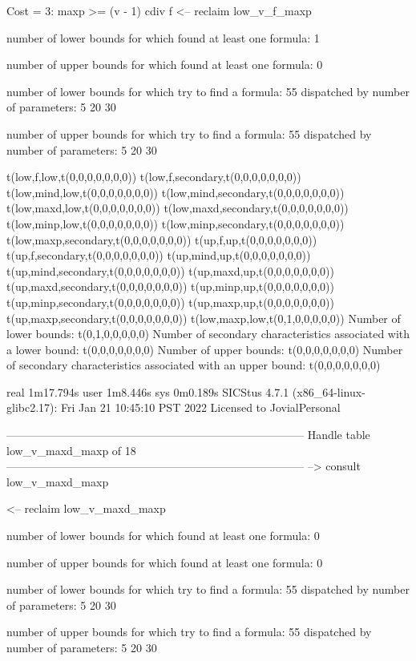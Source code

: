 Cost =  3:  maxp >= (v - 1) cdiv f
<-- reclaim low_v_f_maxp

number of lower bounds for which found at least one formula: 1

number of upper bounds for which found at least one formula: 0

number of lower bounds for which try to find a formula: 55
dispatched by number of parameters: 5  20  30

number of upper bounds for which try to find a formula: 55
dispatched by number of parameters: 5  20  30

t(low,f,low,t(0,0,0,0,0,0,0))
t(low,f,secondary,t(0,0,0,0,0,0,0))
t(low,mind,low,t(0,0,0,0,0,0,0))
t(low,mind,secondary,t(0,0,0,0,0,0,0))
t(low,maxd,low,t(0,0,0,0,0,0,0))
t(low,maxd,secondary,t(0,0,0,0,0,0,0))
t(low,minp,low,t(0,0,0,0,0,0,0))
t(low,minp,secondary,t(0,0,0,0,0,0,0))
t(low,maxp,secondary,t(0,0,0,0,0,0,0))
t(up,f,up,t(0,0,0,0,0,0,0))
t(up,f,secondary,t(0,0,0,0,0,0,0))
t(up,mind,up,t(0,0,0,0,0,0,0))
t(up,mind,secondary,t(0,0,0,0,0,0,0))
t(up,maxd,up,t(0,0,0,0,0,0,0))
t(up,maxd,secondary,t(0,0,0,0,0,0,0))
t(up,minp,up,t(0,0,0,0,0,0,0))
t(up,minp,secondary,t(0,0,0,0,0,0,0))
t(up,maxp,up,t(0,0,0,0,0,0,0))
t(up,maxp,secondary,t(0,0,0,0,0,0,0))
t(low,maxp,low,t(0,1,0,0,0,0,0))
Number of lower bounds:                                             t(0,1,0,0,0,0,0)
Number of secondary characteristics associated with a lower bound:  t(0,0,0,0,0,0,0)
Number of upper bounds:                                             t(0,0,0,0,0,0,0)
Number of secondary characteristics associated with an upper bound: t(0,0,0,0,0,0,0)

real	1m17.794s
user	1m8.446s
sys	0m0.189s
SICStus 4.7.1 (x86_64-linux-glibc2.17): Fri Jan 21 10:45:10 PST 2022
Licensed to JovialPersonal


--------------------------------------------------------------------------------
Handle table low_v_maxd_maxp of 18
--------------------------------------------------------------------------------
--> consult low_v_maxd_maxp

<-- reclaim low_v_maxd_maxp

number of lower bounds for which found at least one formula: 0

number of upper bounds for which found at least one formula: 0

number of lower bounds for which try to find a formula: 55
dispatched by number of parameters: 5  20  30

number of upper bounds for which try to find a formula: 55
dispatched by number of parameters: 5  20  30


